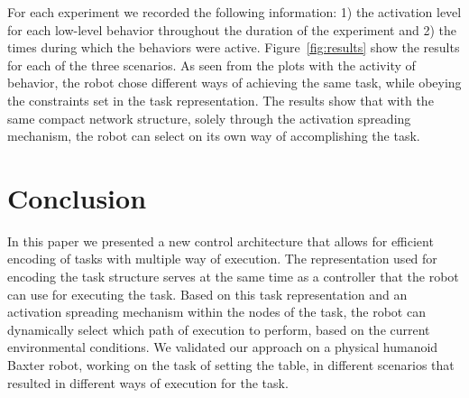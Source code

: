 \documentclass[letterpaper, 10 pt, conference]{ieeeconf}  %
\begin{document}

For each experiment we recorded the following information: 1) the activation level for each low-level behavior throughout the duration of the experiment and 2) the times during which the behaviors were active. Figure~\ref{fig:results} show the results for each of the three scenarios. As seen from the plots with the activity of behavior, the robot chose different ways of achieving the same task, while obeying the constraints set in the task representation. The results show that with the same compact network structure, solely through the activation spreading mechanism, the robot can select on its own way of accomplishing the task.


\section{Conclusion}
\label{conclusion}
In this paper we presented a new control architecture that allows for efficient encoding of tasks with multiple way of execution. The representation used for encoding the task structure serves at the same time as a controller that the robot can use for executing the task. Based on this task representation and an activation spreading mechanism within the nodes of the task, the robot can dynamically select which path of execution to perform, based on the current environmental conditions. We validated our approach on a physical humanoid Baxter robot, working on the task of setting the table, in different scenarios that resulted in different ways of execution for the task.





\end{document}

